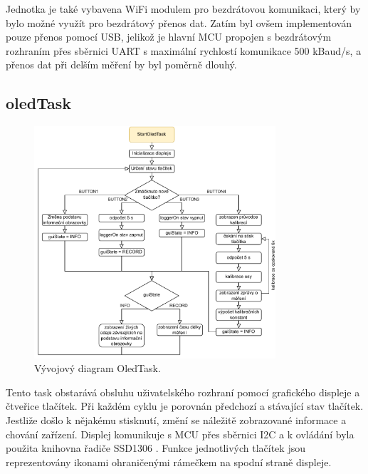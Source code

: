 Jednotka je také vybavena WiFi modulem pro bezdrátovou komunikaci, který by bylo možné využít pro bezdrátový přenos dat. Zatím byl ovšem implementován pouze přenos pomocí USB, jelikož je hlavní MCU propojen s bezdrátovým rozhraním přes sběrnici UART s maximální rychlostí komunikace 500 kBaud/s, a přenos dat při delším měření by byl poměrně dlouhý.

\subsection{oledTask}
\begin{figure}[h]
    \centering
    \includegraphics[width=0.8\textwidth]{obrazky/OledTask}
    \caption{Vývojový diagram OledTask.}
\end{figure}
Tento task obstarává obsluhu uživatelského rozhraní pomocí grafického displeje a čtveřice tlačítek. Při každém cyklu
je porovnán předchozí a stávající stav tlačítek. Jestliže došlo k nějakému stisknutí, změní se náležitě zobrazované informace a chování zařízení. Displej komunikuje s \ac{MCU} přes sběrnici I2C a k ovládání byla použita knihovna řadiče SSD1306 \cite{Alekseev2024}. Funkce jednotlivých tlačítek jsou reprezentovány ikonami ohraničenými rámečkem na spodní straně displeje.

